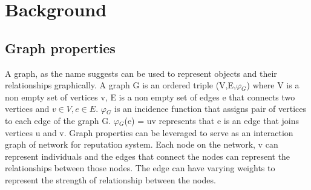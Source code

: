 \chapter{Background} \label{ch:background}
\section{Graph properties}
A graph, as the name suggests can be used to represent objects and their relationships 
graphically. A graph G is an ordered triple (V,E,$\varphi$$_{G}$) where V is a non empty set
of vertices v, E is a non empty set of edges e that connects two vertices and 
$v \in V, e \in E$. $\varphi$$_{G}$ is an incidence function that assigns pair of vertices
to each edge of the graph G. $\varphi$$_{G}$(e) = uv represents that e is an edge that 
joins vertices u and v. Graph properties can be leveraged to serve as an interaction 
graph of network for reputation system. Each node on the network, v can represent 
individuals and the edges that connect the nodes can represent the relationships 
between those nodes. The edge can have varying weights to represent the strength of 
relationship between the nodes. \cite{bondy1976graph}





